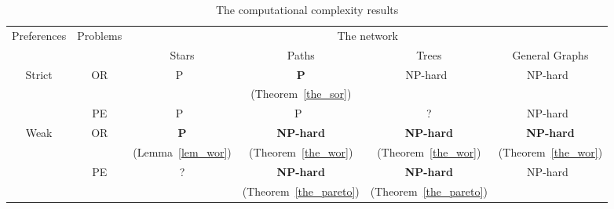 \begin{table}[htbp]
    \centering
    \caption{The computational complexity results}\label{table1}
    \begin{tabular}{c|c|c|c|c|c}
        \hline
        \multirow{2}{*}{Preferences} & \multirow{2}{*}{Problems} & \multicolumn{4}{c}{The network}\\
        \cline{3-6}
         &  & Stars & Paths & Trees & General Graphs\\
        \hline
        \multirow{3}{*}{Strict} & \multirow{2}{*}{OR} &  \multirow{2}{*}{P~\citep{DBLP:conf/ijcai/GourvesLW17}} & \textbf{P} & \multirow{2}{*}{NP-hard~\citep{DBLP:conf/ijcai/GourvesLW17}} & \multirow{2}{*}{NP-hard~\citep{DBLP:conf/ijcai/GourvesLW17}}\\
        & & &(Theorem~\ref{the_sor}) & &\\
        \cline{2-6}
        & PE & P~\citep{DBLP:conf/ijcai/GourvesLW17} & P~\citep{DBLP:conf/ijcai/GourvesLW17} & ? & NP-hard~\citep{DBLP:conf/ijcai/GourvesLW17}\\
        \hline
        \multirow{4}{*}{Weak} & \multirow{2}{*}{OR} & \textbf{P} & \textbf{NP-hard}  & \textbf{NP-hard}  & \textbf{NP-hard}\\
         &  & (Lemma~\ref{lem_wor}) & (Theorem~\ref{the_wor}) & (Theorem~\ref{the_wor}) & (Theorem~\ref{the_wor})\\
        \cline{2-6}
        & \multirow{2}{*}{PE} & \multirow{2}{*}{?} & \textbf{NP-hard}  & \textbf{NP-hard}  & \multirow{2}{*}{NP-hard~\citep{DBLP:conf/ijcai/GourvesLW17}}\\
         &  &  & (Theorem~\ref{the_pareto}) & (Theorem~\ref{the_pareto}) & \\
        \hline
    \end{tabular}
\end{table}




